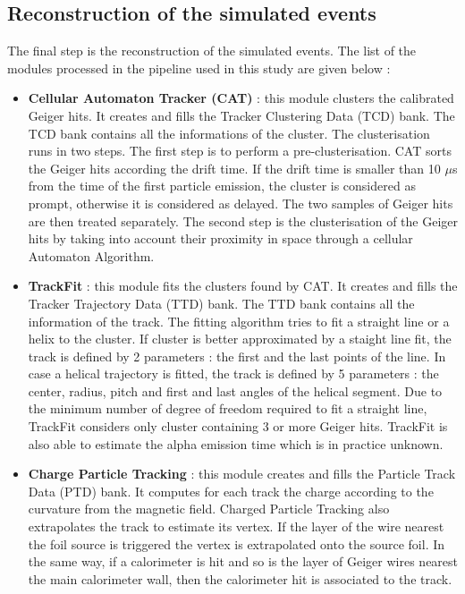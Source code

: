 \documentclass[main.tex]{subfiles}
\begin{document}
\FloatBarrier


\subsection{Reconstruction of the simulated events}\label{sec:ReconstructionBi214}


\noindent The final step is the reconstruction of the simulated events. The list of the modules processed in the pipeline used in this study are given below : 


\begin{itemize}


\item \textbf{Cellular Automaton Tracker (CAT)} : this module clusters the calibrated Geiger hits. It creates and fills the Tracker Clustering Data (TCD) bank. The TCD bank contains all the informations of the cluster. The clusterisation runs in two steps. The first step is to perform a pre-clusterisation. CAT sorts the Geiger hits according the drift time. If the drift time is smaller than 10 $\mu$s from the time of the first particle emission, the cluster is considered as prompt, otherwise it is considered as delayed. The two samples of Geiger hits are then treated separately. The second step is the clusterisation of the Geiger hits by taking into  account their proximity in space through a cellular Automaton Algorithm. %

\item \textbf{TrackFit} : this module fits the clusters found by CAT. It creates and fills the Tracker Trajectory Data (TTD) bank. The TTD bank contains all the information of the track. The fitting algorithm tries to fit a straight line or a helix to the cluster. If cluster is better approximated by a staight line fit, the track is defined by 2 parameters : the first and the last points of the line. In case a helical trajectory is fitted, the track is defined by 5 parameters : the center, radius, pitch and first and last angles of the helical segment. Due to the minimum number of degree of freedom required to fit a straight line, TrackFit considers only cluster containing 3 or more Geiger hits. TrackFit is also able to estimate the alpha emission time which is in practice unknown. %

\item \textbf{Charge Particle Tracking} : this module creates and fills the Particle Track Data (PTD) bank. It computes for each track the charge according to the curvature from the magnetic field.  Charged Particle Tracking also extrapolates the track to estimate its vertex. If the layer of the wire nearest the foil source is triggered the vertex is extrapolated onto the source foil. In the same way, if a calorimeter is hit and so is the layer of Geiger wires nearest the main calorimeter wall, then the calorimeter hit is associated to the track. %
\end{itemize}
\end{document}
